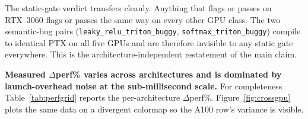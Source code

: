 \documentclass[runningheads]{llncs}
\begin{document}
\begin{table}[h]
\centering
\caption{Cross-architecture static deltas. Identical across all five
GPU classes.}
\label{tab:archindep}
\end{table}

The static-gate verdict transfers cleanly. Anything that flags or
passes on RTX~3060 flags or passes the same way on every other GPU
class. The two semantic-bug pairs (\texttt{leaky\_relu\_triton\_buggy},
\texttt{softmax\_triton\_buggy}) compile to identical PTX on all five
GPUs and are therefore invisible to any static gate everywhere. This is
the architecture-independent restatement of the main claim.

\textbf{Measured $\Delta$perf\% varies across architectures and is
dominated by launch-overhead noise at the sub-millisecond scale.} For
completeness Table~\ref{tab:perfgrid} reports the per-architecture
$\Delta$perf\%. Figure~\ref{fig:crossgpu} plots the same data on a
divergent colormap so the A100 row's variance is visible.
\end{document}
